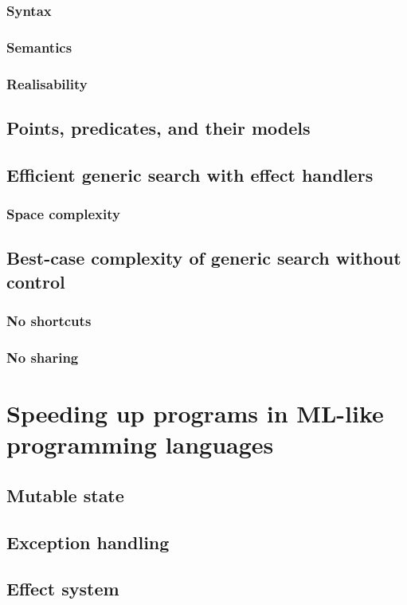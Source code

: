 \documentclass[12pt,phd,lfcs,twoside,openright,logo,leftchapter,normalheadings]{infthesis}
\theoremstyle{plain}
\theoremstyle{definition}
\begin{document}
\subsection{Syntax}
\subsection{Semantics}
\subsection{Realisability}
\section{Points, predicates, and their models}
\section{Efficient generic search with effect handlers}
\subsection{Space complexity}
\section{Best-case complexity of generic search without control}
\subsection{No shortcuts}
\subsection{No sharing}

\chapter{Speeding up programs in ML-like programming languages}
\section{Mutable state}
\section{Exception handling}
\section{Effect system}
\end{document}
